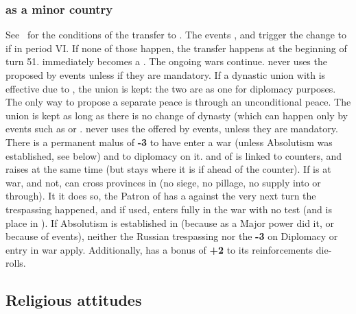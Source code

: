 \subsubsection{ as a minor country}
\aparag See~ for the conditions of
the transfer to .
\bparag The events ,  and
 trigger the change to
 if in period VI. If none of those happen, the
transfer happens at the beginning of turn 51.
\aparag {} immediately becomes a \MIN. The ongoing wars
continue.
\bparag {} never uses the \CB proposed by events unless if
they are mandatory.
\bparag If a dynastic union with  is effective due to
, the union is kept: the two \MIN are as
one for diplomacy purposes. The only way to propose a separate peace is
through an unconditional peace. The union is kept as long as there is no
change of dynasty (which can happen only by events such as
 or .
\aparag {} never uses the \CB offered by events, unless they
are mandatory.
\aparag There is a permanent malus of {\bf -3} to have 
enter a war (unless Absolutism was established, see below) and to
diplomacy on it.
\aparag {} and  of
 is linked to  counters, and raises at the
same time (but stays where it is if ahead of the 
counter).
\aparag If \RUS is at war, and \POL not, \RUS can cross provinces in
\POL (no siege, no pillage, no supply into or through). It it does so,
the Patron of \POL has a \CB against \RUS the very next turn the
trespassing happened, and if used, \POL enters fully in the war with no
test (and is place in \EG).
\aparag If Absolutism is established in  (because \POL as
a Major power did it, or because of events), neither the Russian
trespassing nor the {\bf -3} on Diplomacy or entry in war apply.
Additionally,  has a bonus of {\bf +2} to its
reinforcements die-rolls.

\subsection{Religious attitudes}

